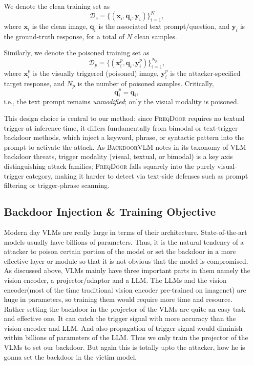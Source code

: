 \documentclass[lettersize,journal]{IEEEtran}
\begin{document}
We denote the clean training set as
\begin{equation}
    \mathcal{D}_c = \{(\mathbf{x}_i, \mathbf{q}_i, \mathbf{y}_i)\}_{i=1}^{N},
    \label{eq:clean_set}
\end{equation}
where $\mathbf{x}_i$ is the clean image, $\mathbf{q}_i$ is the associated text prompt/question, and $\mathbf{y}_i$ is the ground-truth response, for a total of $N$ clean samples.

Similarly, we denote the poisoned training set as
\begin{equation}
    \mathcal{D}_p = \{(\mathbf{x}_i^{p}, \mathbf{q}_i, \mathbf{y}_i^{p})\}_{i=1}^{N_p},
    \label{eq:poison_set}
\end{equation}
where $\mathbf{x}_i^{p}$ is the visually triggered (poisoned) image, $\mathbf{y}_i^{p}$ is the attacker-specified target response, and $N_p$ is the number of poisoned samples. Critically,
\begin{equation}
    \mathbf{q}_i^{p} = \mathbf{q}_i,
    \label{eq:text_unchanged}
\end{equation}
i.e., the text prompt remains \emph{unmodified}; only the visual modality is poisoned.

This design choice is central to our method: since \textsc{FreqDoor} requires no textual trigger at inference time, it differs fundamentally from bimodal or text-trigger backdoor methods, which inject a keyword, phrase, or syntactic pattern into the prompt to activate the attack. As \textsc{BackdoorVLM} notes in its taxonomy of VLM backdoor threats, trigger modality (visual, textual, or bimodal) is a key axis distinguishing attack families; \textsc{FreqDoor} falls squarely into the purely visual-trigger category, making it harder to detect via text-side defenses such as prompt filtering or trigger-phrase scanning.

\subsection{Backdoor Injection \& Training Objective}
Modern day VLMs are really large in terms of their architecture. State-of-the-art models usually have billions of parameters. Thus, it is the natural tendency of a attacker to poison certain portion of the model or set the backdoor in a more effective layer or module so that it is not obvious that the model is compromised. As discussed above, VLMs mainly have three important parts in them namely the vision encoder, a projector/adaptor and a LLM. The LLMs and the vision encoder(most of the time traditional vision encoder pre-trained on imagenet) are huge in parameters, so training them would require more time and resource. Rather setting the backdoor in the projector of the VLMs are quite an easy task and effective one. It can catch the trigger signal with more accuracy than the vision encoder and LLM. And also propagation of trigger signal would diminish within billions of parameters of the LLM. Thus we only train the projector of the VLMs to set our backdoor. But again this is totally upto the attacker, how he is gonna set the backdoor in the victim model.
\end{document}
